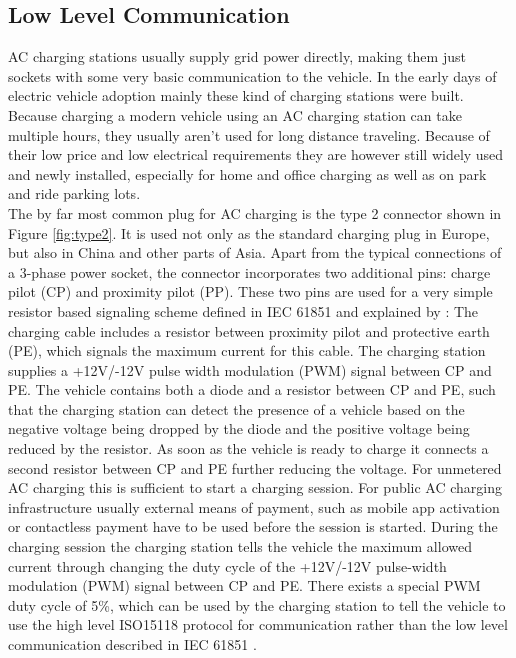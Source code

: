\documentclass[conference,flushend]{iaria} %
\begin{document}
\subsection{Low Level Communication}
AC charging stations usually supply grid power directly, making them just sockets with some very basic communication to the vehicle.
In the early days of electric vehicle adoption mainly these kind of charging stations were built.
Because charging a modern vehicle using an AC charging station can take multiple hours, they usually aren't used for long distance traveling.
Because of their low price and low electrical requirements they are however still widely used and newly installed, especially for home and office charging as well as on park and ride parking lots. \\
The by far most common plug for AC charging is the type 2 connector shown in Figure \ref{fig:type2}. It is used not only as the standard charging plug in Europe, but also in China and other parts of Asia.
Apart from the typical connections of a 3-phase power socket, the connector incorporates two additional pins: charge pilot (CP) and proximity pilot (PP).
These two pins are used for a very simple resistor based signaling scheme defined in IEC 61851 \cite{iec_iec_2010} and explained by \cite{dalheimer_ladeinfrastruktur_2017}:
The charging cable includes a resistor between proximity pilot and protective earth (PE), which signals the maximum current for this cable.
The charging station supplies a +12V/-12V pulse width modulation (PWM) signal between CP and PE.
The vehicle contains both a diode and a resistor between CP and PE, such that the charging station can detect the presence of a vehicle based on the negative voltage being dropped by the diode and the positive voltage being reduced by the resistor.
As soon as the vehicle is ready to charge it connects a second resistor between CP and PE further reducing the voltage.
For unmetered AC charging this is sufficient to start a charging session.
For public AC charging infrastructure usually external means of payment, such as mobile app activation or contactless payment have to be used before the session is started.
During the charging session the charging station tells the vehicle the maximum allowed current through changing the duty cycle of the +12V/-12V pulse-width modulation (PWM) signal between CP and PE.
There exists a special PWM duty cycle of 5\%, which can be used by the charging station to tell the vehicle to use the high level ISO15118 protocol for communication rather than the low level communication described in IEC 61851 \cite{iec_iec_2010}.
\end{document}
